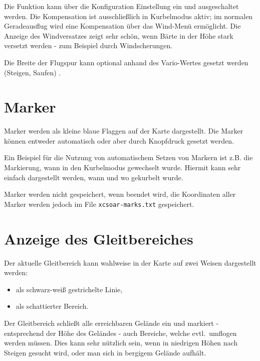 Die Funktion  kann über die Konfiguration Einstellung ein und ausgeschaltet werden.  Die Kompensation ist ausschließlich in Kurbelmodus aktiv; im normalen Geradeausflug wird eine Kompensation über das Wind-Menü ermöglicht.
Die Anzeige des Windversatzes zeigt sehr schön, wenn Bärte in der Höhe stark versetzt werden - zum Beispiel durch Windscherungen.

Die Breite der Flugspur  kann optional anhand des Vario-Wertes gesetzt werden (Steigen, Saufen) .
\section{Marker}

Marker werden als kleine blaue Flaggen auf der Karte dargestellt. 
Die Marker können entweder automatisch oder aber durch Knopfdruck gesetzt werden.

Ein Beispiel für die Nutzung von automatischem Setzen von Markern ist z.B. die 
Markierung, wann in den Kurbelmodus gewechselt wurde. Hiermit kann sehr einfach dargestellt werden, wann und wo gekurbelt wurde.

Marker werden nicht gespeichert, wenn \xc beendet wird, die Koordinaten aller Marker werden jedoch im File \verb|xcsoar-marks.txt| gespeichert.

\section{Anzeige des Gleitbereiches}\label{sec:reach}

Der aktuelle Gleitbereich kann wahlweise in der Karte auf zwei Weisen dargestellt werden:
\begin{itemize}
    \item als schwarz-weiß gestrichelte Linie, 
    \item als schattierter Bereich.
\end{itemize}
Der Gleitbereich schließt alle erreichbaren Gelände ein und markiert - entsprechend der Höhe des Geländes - auch Bereiche, welche evtl.\ umflogen werden müssen.  Dies kann sehr nützlich sein, wenn in niedrigen Höhen nach Steigen gesucht wird, oder man sich in bergigem Gelände aufhält.

